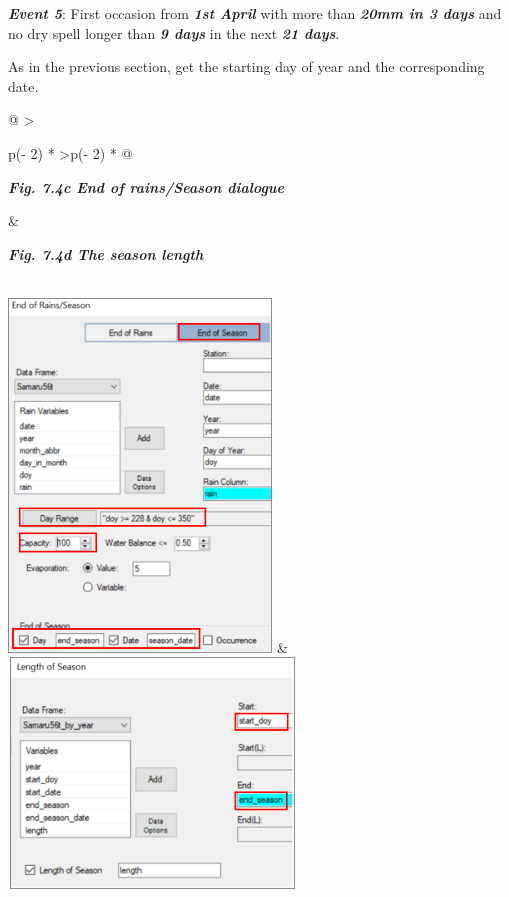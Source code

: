 \documentclass[
  letterpaper,
  DIV=11,
  numbers=noendperiod]{scrreprt}
\begin{document}
\textbf{\emph{Event 5}}: First occasion from \textbf{\emph{1st April}}
with more than \textbf{\emph{20mm in 3 days}} and no dry spell longer
than \textbf{\emph{9 days}} in the next \textbf{\emph{21 days}}.

As in the previous section, get the starting day of year and the
corresponding date.

\begin{longtable}[]{@{}
  >{\raggedright\arraybackslash}p{(\columnwidth - 2\tabcolsep) * }
  >{\raggedleft\arraybackslash}p{(\columnwidth - 2\tabcolsep) * }@{}}
\toprule\noalign{}
\begin{minipage}[b]{\linewidth}\raggedright
\textbf{\emph{Fig. 7.4c End of rains/Season dialogue}}
\end{minipage} & \begin{minipage}[b]{\linewidth}\raggedleft
\textbf{\emph{Fig. 7.4d The season length}}
\end{minipage} \\
\midrule\noalign{}
\endhead
\bottomrule\noalign{}
\endlastfoot
\includegraphics[width=2.75298in,height=3.69728in]{figures/Fig7.4c.png}
&
\includegraphics[width=3.01in,height=2.40907in]{figures/Fig7.4d.png} \\
\end{longtable}
\end{document}
